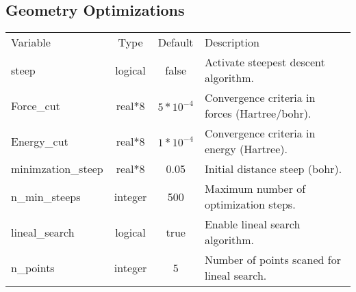 \documentclass[journal=jctcce,manuscript=article]{achemso}
\begin{document}
    \subsection{Geometry Optimizations}
    \begin{table}  [H]
      \begin{center}
      \begin{tabular}{ l c c l}
         Variable & Type & Default & Description \\
         steep & logical & false & Activate steepest descent algorithm. \\
         Force\_cut & real*8 & $5 * 10^{-4}$ & Convergence criteria in forces (Hartree/bohr). \\
         Energy\_cut & real*8 & $1 * 10^{-4}$& Convergence criteria in energy (Hartree). \\
         minimzation\_steep & real*8 & 0.05 & Initial distance steep (bohr).\\
         n\_min\_steeps  &  integer & 500 & Maximum number of optimization steps.\\
         lineal\_search & logical & true & Enable lineal search algorithm.\\
         n\_points & integer & 5 & Number of points scaned for lineal search.\\
       \end{tabular}
       \end{center}
      \label{geom.optim}
    \end{table} 
    
\end{document}

